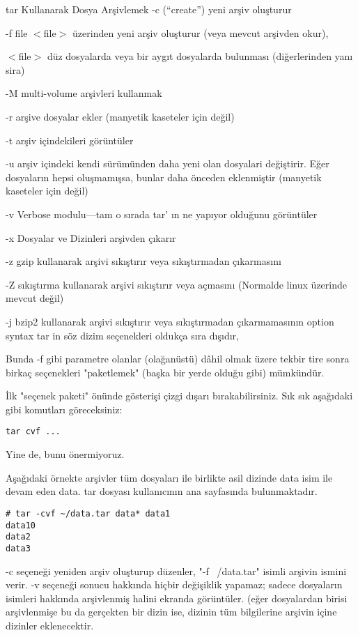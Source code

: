 \begin{section}{tar Kullanarak Dosya Arşivlemek}
-c (“create”) yeni arşiv oluşturur

-f file $<$file$>$ üzerinden yeni arşiv oluşturur (veya mevcut arşivden okur),

$<$file$>$ düz dosyalarda veya bir aygıt dosyalarda bulunması (diğerlerinden yanı sira)

-M multi-volume arşivleri kullanmak

-r arşive dosyalar ekler (manyetik kaseteler için değil)

-t arşiv içindekileri görüntüler

-u arşiv içindeki kendi sürümünden daha yeni olan dosyalari değiştirir. Eğer dosyaların hepsi oluşmamışsa, bunlar daha önceden eklenmiştir (manyetik kaseteler için değil)

-v Verbose modulu—tam o sırada tar' ın ne yapıyor olduğunu görüntüler

-x Dosyalar ve Dizinleri arşivden çıkarır

-z gzip kullanarak arşivi sıkıştırır veya sıkıştırmadan çıkarmasını

-Z sıkıştırma kullanarak arşivi sıkıştırır veya açmasını (Normalde linux üzerinde mevcut değil)

-j bzip2 kullanarak arşivi sıkıştırır veya sıkıştırmadan çıkarmamasının
option syntax tar in söz dizim seçenekleri oldukça sıra dışıdır,

Bunda -f gibi parametre olanlar (olağanüstü) dâhil olmak üzere tekbir tire sonra birkaç seçenekleri "paketlemek" (başka bir yerde olduğu gibi) mümkündür.

İlk "seçenek paketi" önünde gösterişi çizgi dışarı bırakabilirsiniz. Sık sık aşağıdaki gibi komutları göreceksiniz:
\begin{verbatim}
tar cvf ...
\end{verbatim}
Yine de,  bunu önermiyoruz.

Aşağıdaki örnekte arşivler tüm dosyaları ile birlikte asil dizinde data isim ile devam eden data. tar dosyası kullanıcının ana sayfasında bulunmaktadır.
\begin{verbatim}
# tar -cvf ~/data.tar data* data1
data10
data2
data3
\end{verbatim}
-c seçeneği yeniden arşiv oluşturup düzenler, "-f ~/data.tar" isimli arşivin ismini verir. -v seçeneği sonucu hakkında hiçbir değişiklik yapamaz; sadece dosyaların isimleri hakkında arşivlenmiş halini ekranda görüntüler. (eğer dosyalardan birisi arşivlenmişe bu da gerçekten bir dizin ise, dizinin tüm bilgilerine arşivin içine dizinler eklenecektir.


\end{section}
